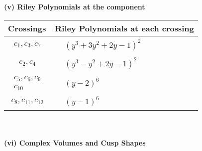 \documentclass[1p]{elsarticle_modified}
\theoremstyle{definition}
\begin{document}
\newpage\renewcommand{\arraystretch}{1}
\flushleft \textbf{(v) Riley Polynomials at the component}\newline \\
\begin{tabular}{m{50pt}|m{274pt}}
Crossings & \hspace{64pt}Riley Polynomials at each crossing \\
\hline $$\begin{aligned}c_{1},c_{3},c_{7}\end{aligned}$$&$\begin{aligned}
&(y^3+3 y^2+2 y-1)^2
\end{aligned}$\\
\hline $$\begin{aligned}c_{2},c_{4}\end{aligned}$$&$\begin{aligned}
&(y^3- y^2+2 y-1)^2
\end{aligned}$\\
\hline $$\begin{aligned}c_{5},c_{6},c_{9}\\c_{10}\end{aligned}$$&$\begin{aligned}
&(y-2)^6
\end{aligned}$\\
\hline $$\begin{aligned}c_{8},c_{11},c_{12}\end{aligned}$$&$\begin{aligned}
&(y-1)^6
\end{aligned}$\\
\hline
\end{tabular}\\~\\
\newpage\flushleft \textbf{(vi) Complex Volumes and Cusp Shapes}
\end{document}
